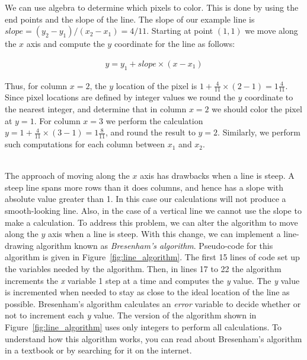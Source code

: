\documentclass[epsfig,10pt,fullpage]{article}
\begin{document}
We can use algebra to determine which pixels to color. This is done by using the end points and 
the slope of the line. The slope of our example line is $slope = (y_2 - y_1)/(x_2 - x_1) = 4/11$. 
Starting at point $(1,1)$ we move along the $x$ axis and compute the $y$ coordinate for the 
line as follows:

\begin{eqnarray*}
y = y_1 + slope \times (x - x_1)
\end{eqnarray*}

Thus, for column $x = 2$, the $y$ location of the pixel is
$1 + \frac{4}{11} \times (2-1) = 1 \frac{4}{11}$. 
Since pixel locations are defined by integer values we round the $y$ coordinate to the nearest 
integer, and determine that in column $x = 2$ we should color the pixel at $y = 1$. For
column $x = 3$ we perform the calculation $y = 1 + \frac{4}{11} \times (3-1) = 1
\frac{8}{11}$, and round the result to $y = 2$.  Similarly, we perform such computations 
for each column between $x_1$ and $x_2$.

~\\
The approach of moving along the $x$ axis has drawbacks when a line is steep. A steep line
spans more rows than it does columns, and hence has a slope with absolute value greater than 
1.  In this case our calculations will not produce a smooth-looking line.  Also, in the case
of a vertical line we cannot use the slope to make a calculation.  To address this 
problem, we can alter the algorithm to move along the $y$ axis when a line is steep. With 
this change, we can implement a line-drawing algorithm known as {\it Bresenham's algorithm}.
Pseudo-code for this algorithm is given in Figure~\ref{fig:line_algorithm}. The first 15
lines of code set up the variables needed by the algorithm. 
Then, in lines 17 to 22 the algorithm increments the {\it x} variable 1 step at a time
and computes the {\it y} value. The {\it y} value is incremented when needed to stay as
close to the ideal location of the line as possible. Bresenham's algorithm calculates an
{\it error} variable to decide whether or not to increment each {\it y} value. The version
of the algorithm shown in Figure~\ref{fig:line_algorithm} uses only integers to perform
all calculations.  To understand how this algorithm works, you can read about Bresenham's
algorithm in a textbook or by searching for it on the internet.
\end{document}

